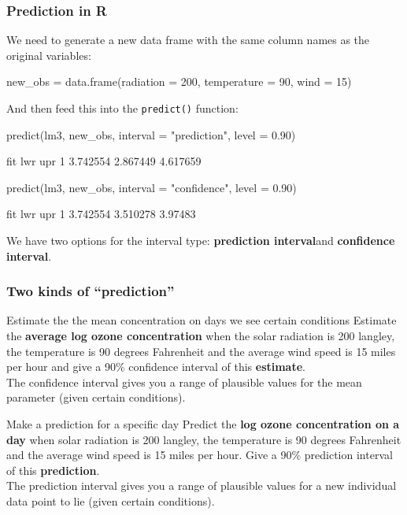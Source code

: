 \documentclass[a4paper]{article}
\begin{document}
\subsubsection{Prediction in R}
We need to generate a new data frame with the same column names as the original variables:
\begin{Schunk}
\begin{Sinput}
new_obs = data.frame(radiation = 200, temperature = 90, wind = 15)
\end{Sinput}
\end{Schunk}
And then feed this into the \lstinline|predict()| function:
\begin{Schunk}
\begin{Sinput}
predict(lm3, new_obs, interval = "prediction", level = 0.90)
\end{Sinput}
\begin{Soutput}
       fit      lwr      upr
1 3.742554 2.867449 4.617659
\end{Soutput}
\begin{Sinput}
predict(lm3, new_obs, interval = "confidence", level = 0.90)
\end{Sinput}
\begin{Soutput}
       fit      lwr     upr
1 3.742554 3.510278 3.97483
\end{Soutput}
\end{Schunk}
We have two options for the interval type: \textbf{prediction interval}and \textbf{confidence interval}.
\subsubsection{Two kinds of ``prediction''}
\begin{redbox}{Estimate the the mean concentration on days we see certain conditions}
	Estimate the \textbf{average log ozone concentration} when the solar radiation is 200 langley, the temperature is 90 degrees Fahrenheit and the average wind speed is 15 miles per hour and give a 90\% confidence interval of this \textbf{estimate}.\\
	The confidence interval gives you a range of plausible values for the mean parameter (given certain conditions).
\end{redbox}
\begin{redbox}{Make a prediction for a specific day}
	Predict the \textbf{log ozone concentration on a day\textbf{}} when solar radiation is 200 langley, the temperature is 90 degrees Fahrenheit and the average wind speed is 15 miles per hour. Give a 90\% prediction interval of this \textbf{prediction}.\\
	The prediction interval gives you a range of plausible values for a new individual data point to lie (given certain conditions).
\end{redbox}
\end{document}

